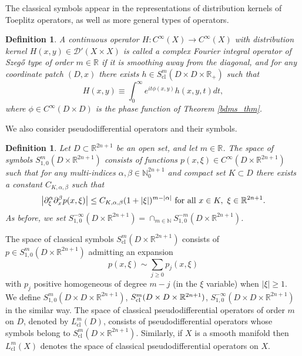 \documentclass{article}
\newtheorem{definition}[theorem]{Definition}
\newcommand{\RR}{\mathbb R}
\newcommand{\NN}{\mathbb N}
\newcommand{\mcd}{\mathcal D}
\DeclareMathOperator{\cl}{cl}
\begin{document}
The classical symbols appear in the representations of distribution kernels of Toeplitz operators, as well as more general types of operators.
%
\begin{definition}\label{order_def} A continuous operator $H: C^\infty(X) \to C^\infty(X)$ with distribution kernel $H(x,y)\in \mcd'(X \times X)$ is called a complex Fourier integral operator of Szeg\H{o} type of order $m \in \RR$ if it is smoothing away from the diagonal, and for any coordinate patch $(D,x)$ there exists $h \in S^m_{\cl}(D \times  D \times \RR_+)$ such that $$H(x,y) \equiv \int_0^\infty e^{it \phi(x,y)}h(x,y,t) dt,$$
where $\phi \in C^\infty(D \times D)$ is the phase function of Theorem \ref{bdms_thm}.
\end{definition}
We also consider pseudodifferential operators and their symbols.
%
\begin{definition} Let $D \subset \RR^{2n+1}$ be an open set, and let $m \in \RR$. The space of symbols $S^m_{1,0}(D\times \RR^{2n+1})$ consists of functions $p(x, \xi) \in C^\infty(D \times \RR^{2n+1})$ such that for any multi-indices $\alpha, \beta \in \NN_0^{2n+1}$ and compact set $K \subset D$ there exists a constant $C_{K, \alpha, \beta}$ such that
\begin{equation*} \big{|}\partial^\alpha_\xi \partial^\beta_x p(x, \xi) \big{|} \le C_{K, \alpha, \beta} (1+|\xi|)^{m-|\alpha|}\ \text{for all }x \in K,\ \xi \in \RR^{2n+1}.\end{equation*}
As before, we set $S^{-\infty}_{1,0}(D\times \RR^{2n+1}) = \cap_{m \in \NN} S^{-m}_{1,0}(D\times \RR^{2n+1})$. \end{definition}
%
The space of classical symbols $S^m_{\cl}(D\times \RR^{2n+1})$ consists of $p \in S^m_{1,0}(D\times \RR^{2n+1})$ admitting an expansion $$p(x,\xi) \sim \sum_{j \ge 0} p_j(x,\xi)$$ with $p_j$ positive homogeneous of degree $m-j$ (in the $\xi$ variable) when $|\xi| \ge 1$. 
We define $S^m_{1,0}(D\times D\times\mathbb R^{2n+1})$, $S^m_{{\rm cl\,}}(D\times D\times\mathbb R^{2n+1})$, $S^{-\infty}_{1,0}(D\times D\times\mathbb R^{2n+1})$ in the similar way. 
The space of classical pseudodifferential operators of order $m$ on $D$, denoted by $L^m_{\cl}(D)$, consists of pseudodifferential operators whose symbols belong to $S^m_{\cl}(D\times \RR^{2n+1})$. Similarly, if $X$ is a smooth manifold then $L^m_{\cl}(X)$ denotes the space of classical pseudodifferential operators on $X$.
%
%
%
\end{document}
